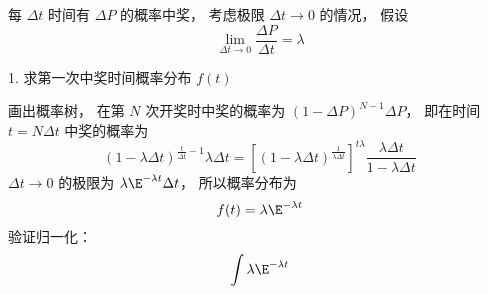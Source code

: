 
每 $\Delta t$ 时间有 $\Delta P$ 的概率中奖， 考虑极限 $\Delta t\to 0$ 的情况， 假设
\begin{equation}
\lim_{\Delta t\to 0}\frac{\Delta P}{\Delta t} = \lambda
\end{equation}


1. 求第一次中奖时间概率分布 $f(t)$

画出概率树， 在第 $N$ 次开奖时中奖的概率为 $(1-\Delta P)^{N-1} \Delta P$， 即在时间 $t = N\Delta t$ 中奖的概率为
\begin{equation}
(1-\lambda\Delta t)^{\frac{t}{\Delta t}-1} \lambda\Delta t
= [(1-\lambda\Delta t)^{\frac{1}{\lambda\Delta t}}]^{t\lambda} \frac{\lambda\Delta t}{1-\lambda\Delta t}
\end{equation}
$\Delta t\to 0$ 的极限为 $\lambda\E^{-\lambda t}\Delta t$， 所以概率分布为
\begin{equation}
f(t) = \lambda\E^{-\lambda t}
\end{equation}
验证归一化：
\begin{equation}
\int \lambda\E^{-\lambda t}
\end{equation}
